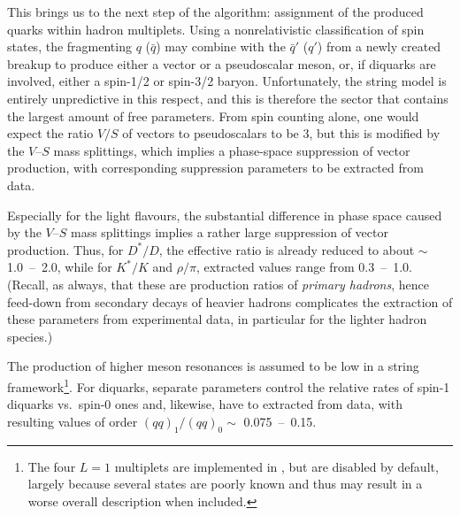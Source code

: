 This brings us to the next step of the algorithm: 
assignment of the produced quarks within hadron
multiplets. 
%
%
Using a nonrelativistic classification of spin states, 
the fragmenting $q$ ($\bar{q}$) may combine with the $\bar{q}'$ 
($q'$) from a newly created breakup to produce either a vector or
a pseudoscalar meson, or, if diquarks are involved, either a spin-1/2
or spin-3/2 baryon. Unfortunately, the string model is  entirely
unpredictive in this respect, and this is therefore the sector that
contains the largest amount of free parameters. 
 From spin counting alone, one would expect the ratio $V/S$ of
vectors to pseudoscalars to be 3, but this is modified by the $V$--$S$
mass splittings, which implies a phase-space suppression of vector production,
with corresponding suppression parameters to be extracted from data. 

Especially for the light flavours, the substantial difference
in phase space caused by the $V$--$S$ mass splittings 
implies a rather large suppression of vector production. Thus,
for $D^*/D$, the effective  
ratio is already reduced to about $\sim$ 1.0~--~2.0, while for $K^*/K$
and $\rho/\pi$,  extracted values range from 0.3~--~1.0. (Recall, as 
always, that these are production ratios of \emph{primary hadrons},
hence feed-down from secondary decays of heavier hadrons 
complicates the extraction of these parameters from
experimental data, in particular for the lighter hadron species.)

%
%
The production of higher meson resonances is assumed to be low in a string
framework\footnote{The four $L = 1$ multiplets are implemented in \Py, 
but are disabled by default, largely because several states are poorly
known and thus may result in a worse overall description when
included.}. 
For diquarks, separate parameters control the relative
rates of spin-1 diquarks vs.\ spin-0 ones and, likewise, have to
extracted from data, with resulting values of order $(qq)_1/(qq)_0
\sim$ 0.075~--~0.15. 

